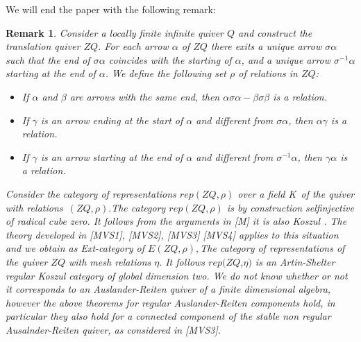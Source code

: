 \documentclass{amsart}
\theoremstyle{plain}
\newtheorem{remark}{Remark}
\numberwithin{equation}{section}
\begin{document}
We will end the paper with the following remark:

\begin{remark}
Consider a locally finite infinite quiver $Q$ and construct the translation
quiver $ZQ$. For each arrow $\alpha $ of $ZQ$ there exits a unique arrow $\sigma \alpha $ such that the end of $\sigma \alpha $ coincides with the
starting of $\alpha $, and a unique arrow $\sigma ^{-1}\alpha $ starting at
the end of $\alpha $. We define the following set $\rho $ of relations in $ZQ $:

\begin{itemize}
\item[(i)] If $\alpha $ and $\beta $ are arrows with the same end, then $\alpha \sigma \alpha -\beta \sigma \beta $ is a relation.

\item[(ii)] If $\gamma $ is an arrow ending at the start of $\alpha $ and
different from $\sigma \alpha $, then $\alpha \gamma $ is a relation.

\item[(iii)] If $\gamma $ is an arrow starting at the end of $\alpha $ and
different from $\sigma ^{-1}\alpha $, then $\gamma \alpha $ is a relation.
\end{itemize}

Consider the category of representations $rep(ZQ,\rho )$ over a field
\textrm{K}\textsl{\ }of the quiver with relations\textsl{\ }$(ZQ,\rho ).$The
category $rep(ZQ,\rho )$ is by construction selfinjective of radical cube
zero. It follows from the arguments in [M] it is also Koszul . The theory
developed in [MVS1], [MVS2], [MVS3] [MVS4] applies to this situation and we
obtain as Ext-category of $E(ZQ,\rho ),$The category of representations of
the quiver $ZQ$ with mesh relations $\eta .$ It follows $rep(ZQ$,$\eta )$ is
an Artin-Shelter regular Koszul category of global dimension two. We do not
know whether or not it corresponds to an Auslander-Reiten quiver of a finite
dimensional algebra, however the above theorems for regular Auslander-Reiten
components hold, in particular they also hold for a connected component of
the stable non regular Ausalnder-Reiten quiver, as considered in [MVS3].
\end{remark}
\end{document}
